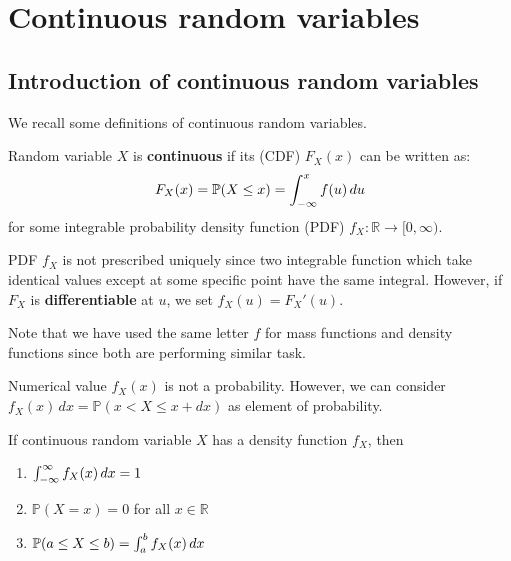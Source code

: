 \documentclass{huhtakm-template-book}
\newcommand{\prob}{\mathbb{P}}
\begin{document}
\chapter{Continuous random variables}
\section{Introduction of continuous random variables}
    We recall some definitions of continuous random variables.
    \begin{defn}
        Random variable $X$ is \textbf{continuous} if its  (CDF) $F_{X}(x)$ can be written as:
        \begin{equation*}
            F_{X}(x)=\prob(X\leq x)=\intlu{-\infty}{x}f(u)\,du
        \end{equation*}
        for some integrable probability density function (PDF) $f_{X}:\mathbb{R}\to[0,\infty)$.
    \end{defn}
    \begin{rem}
        PDF $f_{X}$ is not prescribed uniquely since two integrable function which take identical values except at some specific point have the same integral. However, if $F_{X}$ is \textbf{differentiable} at $u$, we set $f_{X}(u)=F_{X}'(u)$.
    \end{rem}
    Note that we have used the same letter $f$ for mass functions and density functions since both are performing similar task.
    \begin{rem}
        Numerical value $f_{X}(x)$ is not a probability. However, we can consider $f_{X}(x)\,dx=\prob(x<X\leq x+dx)$ as element of probability.
    \end{rem}
    \begin{lem}
        \label{properties of density function}
        If continuous random variable $X$ has a density function $f_{X}$, then
        \begin{enumerate}
            \item $\int_{-\infty}^{\infty} f_{X}(x)\,dx=1$
            \item $\prob(X=x)=0$ for all $x\in\mathbb{R}$
            \item $\prob(a\leq X\leq b)=\intlu{a}{b}f_{X}(x)\,dx$
        \end{enumerate}
    \end{lem}
\end{document}
